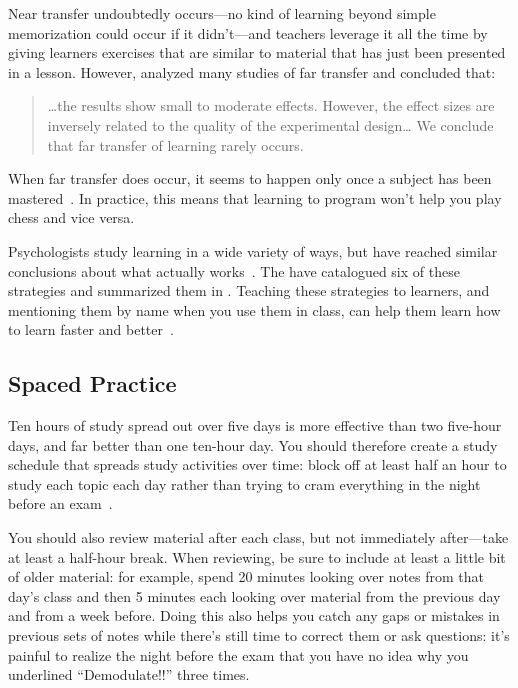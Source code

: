 Near transfer undoubtedly occurs---no kind of learning
beyond simple memorization could occur if it didn't---and
teachers leverage it all the time
by giving learners exercises that are similar to material that has just been presented in a lesson.
However,
\cite{Sala2017} analyzed many studies of far transfer
and concluded that:

\begin{quote}

  {\ldots}the results show small to moderate effects.
  However, the effect sizes are inversely related to the quality of the experimental design{\ldots}
  We conclude that far transfer of learning rarely occurs.

\end{quote}

When far transfer does occur,
it seems to happen only once a subject has been mastered~\cite{Gick1987}.
In practice,
this means that learning to program won't help you play chess and vice versa.


Psychologists study learning in a wide variety of ways,
but have reached similar conclusions about what actually works~\cite{Mark2018}.
The 
have catalogued six of these strategies and
summarized them in .
Teaching these strategies to learners,
and mentioning them by name when you use them in class,
can help them learn how to learn faster and better~\cite{Wein2018a,Wein2018b}.

\subsection*{Spaced Practice}

Ten hours of study spread out over five days
is more effective than two five-hour days,
and far better than one ten-hour day.
You should therefore create a study schedule that spreads study activities over time:
block off at least half an hour to study each topic each day
rather than trying to cram everything in the night before an exam~\cite{Kang2016}.

You should also review material after each class,
but not immediately after---take at least a half-hour break.
When reviewing,
be sure to include at least a little bit of older material:
for example,
spend 20 minutes looking over notes from that day's class
and then 5 minutes each looking over material from the previous day
and from a week before.
Doing this also helps you catch any gaps or mistakes in previous sets of notes
while there's still time to correct them or ask questions:
it's painful to realize the night before the exam
that you have no idea why you underlined ``Demodulate!!'' three times.

